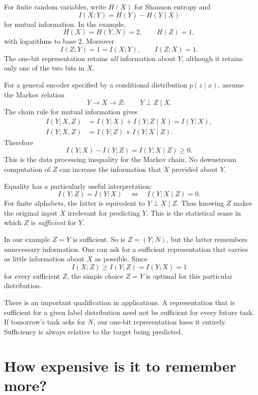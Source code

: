 For finite random variables, write \(H(X)\) for Shannon entropy and
\[
 I(X;Y)=H(Y)-H(Y\mid X)
\]
for mutual information. In the example,
\[
 H(X)=H(Y,N)=2,\qquad H(Z)=1,
\]
with logarithms to base \(2\). Moreover
\[
 I(Z;Y)=1=I(X;Y),\qquad I(Z;X)=1.
\]
The one-bit representation retains \emph{all} information about \(Y\), although it retains only one of the two bits in \(X\).

For a general encoder specified by a conditional distribution \(p(z\mid x)\), assume the Markov relation
\[
 Y\longrightarrow X\longrightarrow Z:
 \qquad Y\perp Z\mid X.
\]
The chain rule for mutual information gives
\begin{align*}
 I(Y;X,Z)&=I(Y;X)+I(Y;Z\mid X)=I(Y;X),\\
 I(Y;X,Z)&=I(Y;Z)+I(Y;X\mid Z).
\end{align*}
Therefore
\begin{equation}
 \boxed{I(Y;X)-I(Y;Z)=I(Y;X\mid Z)\geq0.}
 \label{eq:N20261009-DPI}
\end{equation}
This is the data processing inequality for the Markov chain. No downstream computation of \(Z\) can increase the information that \(X\) provided about \(Y\).

Equality has a particularly useful interpretation:
\[
 I(Y;Z)=I(Y;X)
 \quad\Longleftrightarrow\quad
 I(Y;X\mid Z)=0.
\]
For finite alphabets, the latter is equivalent to \(Y\perp X\mid Z\). Thus knowing \(Z\) makes the original input \(X\) irrelevant for predicting \(Y\). This is the statistical sense in which \(Z\) is \emph{sufficient} for \(Y\).

In our example \(Z=Y\) is sufficient. So is \(Z=(Y,N)\), but the latter remembers unnecessary information. One can ask for a sufficient representation that carries as little information about \(X\) as possible. Since
\[
 I(X;Z)\geq I(Y;Z)=I(Y;X)=1
\]
for every sufficient \(Z\), the simple choice \(Z=Y\) is optimal for this particular distribution.

There is an important qualification in applications. A representation that is sufficient for a given label distribution need not be sufficient for every future task. If tomorrow's task asks for \(N\), our one-bit representation loses it entirely. Sufficiency is always relative to the target being predicted.

\section{How expensive is it to remember more?}

